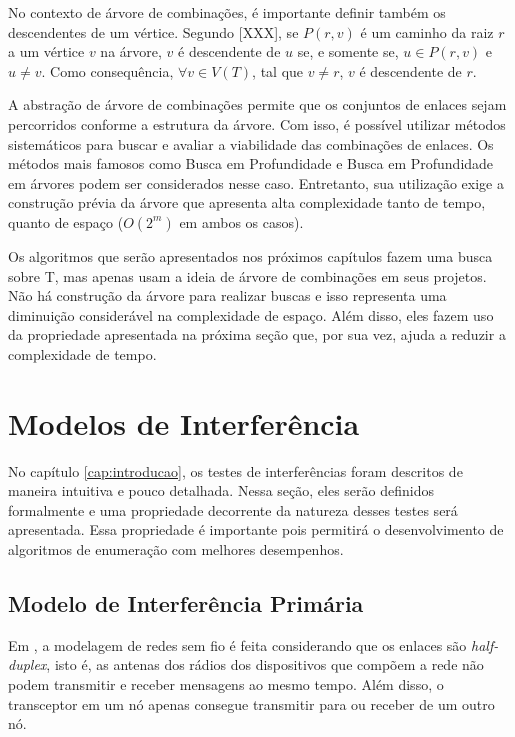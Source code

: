 No contexto de árvore de combinações, é importante definir também os descendentes de um vértice. Segundo [XXX], se $P(r,v)$ é um caminho da raiz $r$ a um vértice $v$ na árvore, $v$ é descendente de $u$ se, e somente se, $u \in P(r,v)$ e $u \neq v$. Como consequência, $\forall v \in V(T)$, tal que $v \neq r$, $v$ é descendente de $r$. 

A abstração de árvore de combinações permite que os conjuntos de enlaces sejam percorridos conforme a estrutura da árvore. Com isso, é possível utilizar métodos sistemáticos para buscar e avaliar a viabilidade das combinações de enlaces. Os métodos mais famosos como Busca em Profundidade e Busca em Profundidade em árvores podem ser considerados nesse caso. Entretanto, sua utilização exige a construção prévia da árvore que apresenta alta complexidade tanto de tempo, quanto de espaço ($O(2^m)$ em ambos os casos).

Os algoritmos que serão apresentados nos próximos capítulos fazem uma busca sobre T, mas apenas usam a ideia de árvore de combinações em seus projetos. Não há construção da árvore para realizar buscas e isso representa uma diminuição considerável na complexidade de espaço. Além disso, eles fazem uso da propriedade apresentada na próxima seção que, por sua vez, ajuda a reduzir a complexidade de tempo.

\section{Modelos de Interferência}
\label{section:interference}

No capítulo \ref{cap:introducao}, os testes de interferências foram descritos de maneira intuitiva e pouco detalhada. Nessa seção, eles serão definidos formalmente e uma propriedade decorrente da natureza desses testes será apresentada. Essa propriedade é importante pois permitirá o desenvolvimento de algoritmos de enumeração com melhores desempenhos.

\subsection{Modelo de Interferência Primária}

Em \cite{primary}, a modelagem de redes sem fio é feita considerando que os enlaces são {\it half-duplex}, isto é, as antenas dos rádios dos dispositivos que compõem a rede não podem transmitir e receber mensagens ao mesmo tempo. Além disso, o transceptor em um nó apenas consegue transmitir para ou receber de um outro nó.

